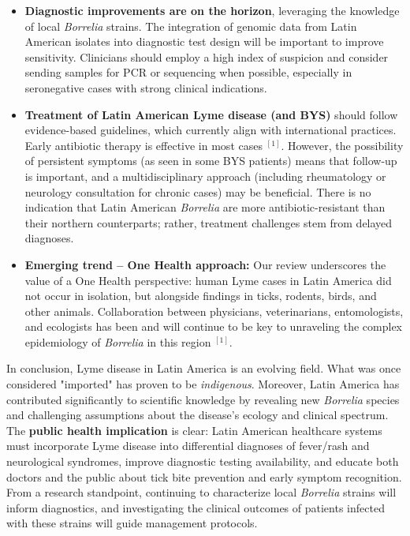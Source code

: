 \documentclass[11pt,letterpaper]{article}
\newcommand{\mycite}[1]{$^{[#1]}$}
\begin{document}
\begin{itemize}[leftmargin=*,itemsep=4pt]
    \item \textbf{Diagnostic improvements are on the horizon}, leveraging the knowledge of local \textit{Borrelia} strains. The integration of genomic data from Latin American isolates into diagnostic test design will be important to improve sensitivity. Clinicians should employ a high index of suspicion and consider sending samples for PCR or sequencing when possible, especially in seronegative cases with strong clinical indications.

    \item \textbf{Treatment of Latin American Lyme disease (and BYS)} should follow evidence-based guidelines, which currently align with international practices. Early antibiotic therapy is effective in most cases \mycite{1}. However, the possibility of persistent symptoms (as seen in some BYS patients) means that follow-up is important, and a multidisciplinary approach (including rheumatology or neurology consultation for chronic cases) may be beneficial. There is no indication that Latin American \textit{Borrelia} are more antibiotic-resistant than their northern counterparts; rather, treatment challenges stem from delayed diagnoses.

    \item \textbf{Emerging trend – One Health approach:} Our review underscores the value of a One Health perspective: human Lyme cases in Latin America did not occur in isolation, but alongside findings in ticks, rodents, birds, and other animals. Collaboration between physicians, veterinarians, entomologists, and ecologists has been and will continue to be key to unraveling the complex epidemiology of \textit{Borrelia} in this region \mycite{1}.
\end{itemize}

In conclusion, Lyme disease in Latin America is an evolving field. What was once considered "imported" has proven to be \textit{indigenous}. Moreover, Latin America has contributed significantly to scientific knowledge by revealing new \textit{Borrelia} species and challenging assumptions about the disease's ecology and clinical spectrum. The \textbf{public health implication} is clear: Latin American healthcare systems must incorporate Lyme disease into differential diagnoses of fever/rash and neurological syndromes, improve diagnostic testing availability, and educate both doctors and the public about tick bite prevention and early symptom recognition. From a research standpoint, continuing to characterize local \textit{Borrelia} strains will inform diagnostics, and investigating the clinical outcomes of patients infected with these strains will guide management protocols.
\end{document}
